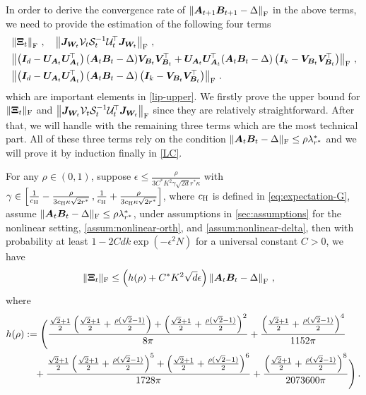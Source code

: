 In order to derive the convergence rate of $\left\|\bm A_{t+1}\bm B_{t+1} - \Delta\right\|_{\rm F}$ in the above terms, we need to provide the estimation of the following four terms
\begin{align*}
    & \left\|\bm \Xi_t\right\|_{\rm F}\,,\quad
    \left\|\bm J_{\bm W_t} \mathcal{V}_t \mathcal{S}_t^{-1} \mathcal{U}^{\!\top}_t\bm J_{\bm W_t}\right\|_{\rm F}\,,\\
    & \left\|\left(\bm I_d - \bm U_{\bm A_t} \bm U_{\bm A_t}^{\!\top}\right)(\bm A_t \bm B_t - \Delta)\bm V_{\bm B_t} \bm V_{\bm B_t}^{\!\top}+\bm U_{\bm A_t} \bm U_{\bm A_t}^{\!\top}(\bm A_t \bm B_t - \Delta)\left(\bm I_k - \bm V_{\bm B_t} \bm V_{\bm B_t}^{\!\top}\right)\right\|_{\rm F}\,,\\
    & \left\|\left(\bm I_d - \bm U_{\bm A_t} \bm U_{\bm A_t}^{\!\top}\right)(\bm A_t \bm B_t - \Delta)\left(\bm I_k - \bm V_{\bm B_t} \bm V_{\bm B_t}^{\!\top}\right)\right\|_{\rm F}\,.
\end{align*}
which are important elements in \cref{lip-upper}. We firstly prove the upper bound for $\|\bm \Xi_t\|_{\rm F}$ and $\left\|\bm J_{\bm W_t} \mathcal{V}_t \mathcal{S}_t^{-1} \mathcal{U}^{\!\top}_t\bm J_{\bm W_t}\right\|_{\rm F}$ since they are relatively straightforward. After that, we will handle with the remaining three terms which are the most technical part.
All of these three terms rely on the condition $\|\bm A_t \bm B_t - \Delta\|_{\rm F}\leq \rho \lambda^*_{r^*}$ and we will prove it by induction finally in \cref{LC}.
\begin{lemma}
\label{err-concen-pop}
For any $\rho \in (0,1)$, suppose $\epsilon \leq \frac{\rho}{3C^*K^2\gamma\sqrt{2d}r^*\kappa}$ with $\gamma\in\left[\frac{1}{c_{\rm H}}-\frac{\rho}{3c_{\rm H}\kappa\sqrt{2r^*}}\,,\frac{1}{c_{\rm H}}+\frac{\rho}{3c_{\rm H}\kappa\sqrt{2r^*}}\right]$, where $c_{\rm H}$ is defined in \cref{eq:expectation-G}, assume $\|\bm A_t \bm B_t - \Delta\|_{\rm F}\leq \rho \lambda^*_{r^*}$, under assumptions in \cref{sec:assumptions} for the nonlinear setting, \cref{assum:nonlinear-orth}, and \cref{assum:nonlinear-delta}, then with probability at least $1-2Cdk\operatorname{exp}\left(-\epsilon^2 N\right)$ for a universal constant $C>0$, we have
\begin{align*}
    \|\bm \Xi_t\|_{\rm F} & \leq \left(h(\rho) + C^* K^2 \sqrt{d} \epsilon\right) \left\|\bm A_t \bm B_t - \Delta\right\|_{\rm F}\,,
\end{align*}
where
\begin{align}\label{h-rho}
h(\rho)&:=\Bigg(\frac{\frac{\sqrt{2}+1}{2}\left(\frac{\sqrt{2}+1}{2}+\frac{\rho(\sqrt{2}-1)}{2}\right)+\left(\frac{\sqrt{2}+1}{2}+\frac{\rho(\sqrt{2}-1)}{2}\right)^2}{8\pi}+\frac{\left(\frac{\sqrt{2}+1}{2}+\frac{\rho(\sqrt{2}-1)}{2}\right)^4}{1152\pi}\notag \\
& \quad + \frac{\frac{\sqrt{2}+1}{2}\left(\frac{\sqrt{2}+1}{2}+\frac{\rho(\sqrt{2}-1)}{2}\right)^5+\left(\frac{\sqrt{2}+1}{2}+\frac{\rho(\sqrt{2}-1)}{2}\right)^6}{1728\pi}+\frac{\left(\frac{\sqrt{2}+1}{2}+\frac{\rho(\sqrt{2}-1)}{2}\right)^{8}}{2073600\pi}\Bigg)\,.
\end{align}
\end{lemma}
